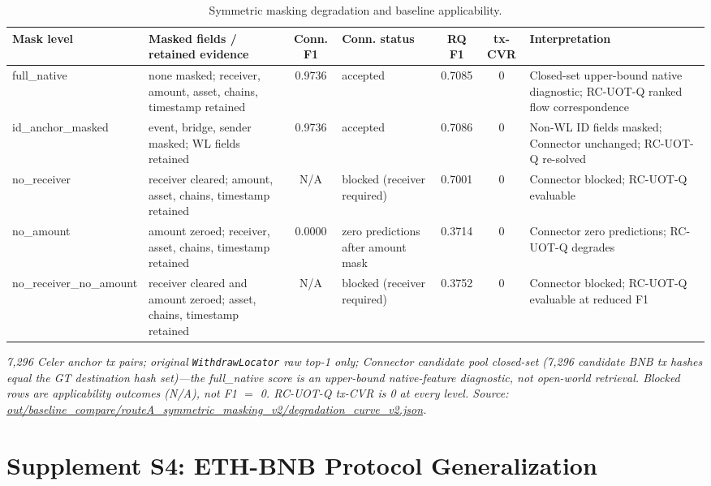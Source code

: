 \documentclass[journal]{IEEEtran}
\begin{document}
\begin{table}[!t]
\caption{Symmetric masking degradation and baseline applicability.}
\label{tab:S3}
\centering
\footnotesize
\setlength{\tabcolsep}{2.5pt}
\begin{tabular}{p{}p{}cp{}ccp{}}
\toprule
Mask level & Masked fields / retained evidence & Conn. F1 & Conn. status & RQ F1 & tx-CVR & Interpretation \\
\midrule
full\_native & none masked; receiver, amount, asset, chains, timestamp retained & 0.9736 & accepted & 0.7085 & 0 & Closed-set upper-bound native diagnostic; RC-UOT-Q ranked flow correspondence \\
id\_anchor\_masked & event, bridge, sender masked; WL fields retained & 0.9736 & accepted & 0.7086 & 0 & Non-WL ID fields masked; Connector unchanged; RC-UOT-Q re-solved \\
no\_receiver & receiver cleared; amount, asset, chains, timestamp retained & N/A & blocked (receiver required) & 0.7001 & 0 & Connector blocked; RC-UOT-Q evaluable \\
no\_amount & amount zeroed; receiver, asset, chains, timestamp retained & 0.0000 & zero predictions after amount mask & 0.3714 & 0 & Connector zero predictions; RC-UOT-Q degrades \\
no\_receiver\_no\_amount & receiver cleared and amount zeroed; asset, chains, timestamp retained & N/A & blocked (receiver required) & 0.3752 & 0 & Connector blocked; RC-UOT-Q evaluable at reduced F1 \\
\bottomrule
\end{tabular}
\end{table}

\emph{7{,}296 Celer anchor tx pairs; original \texttt{WithdrawLocator} raw top-1 only; Connector candidate pool closed-set (7{,}296 candidate BNB tx hashes equal the GT destination hash set)---the full\_native score is an upper-bound native-feature diagnostic, not open-world retrieval. Blocked rows are applicability outcomes (N/A), not F1 $=$ 0. RC-UOT-Q tx-CVR is 0 at every level. Source: \url{out/baseline_compare/routeA_symmetric_masking_v2/degradation_curve_v2.json}.}

\section*{Supplement S4: ETH-BNB Protocol Generalization}
\end{document}
